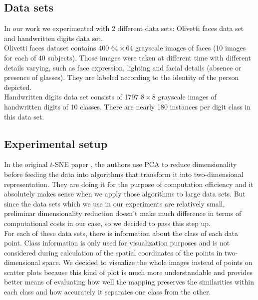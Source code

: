 \subsection{Data sets}

In our work we experimented with 2 different data sets: Olivetti faces data set and handwritten digits data set.\\ 

Olivetti faces dataset contains 400 $64 \times 64$ grayscale images of faces (10 images for each of 40 subjects). Those images were taken at different time with different details varying, such as face expression, lighting and facial details (absence or presence of glasses). They are labeled according to the identity of the person depicted.\\

Handwritten digits data set consists of 1797 $8 \times 8$ grayscale images of handwritten digits of 10 classes. There are nearly 180 instances per digit class in this data set.\\

\subsection{Experimental setup}

In the original $t$-SNE paper \cite{tsnearticle}, the authors use PCA to reduce dimensionality before feeding the data into algorithms that transform it into two-dimensional representation. They are doing it for the purpose of computation efficiency and it absolutely makes sense when we apply those algorithms to large data sets. But since the data sets which we use in our experiments are relatively small, preliminar dimensionality reduction doesn't make much difference in terms of computational costs in our case, so we decided to pass this step up.\\

For each of these data sets, there is information about the class of each data point. Class information is only used for visualization purposes and is not considered during calculation of the spatial coordinates of the points in two-dimensional space. We decided to visualize the whole images instead of points on scatter plots because this kind of plot is much more understandable and provides better means of evaluating how well the mapping preserves the similarities within each class and how accurately it separates one class from the other.\\

